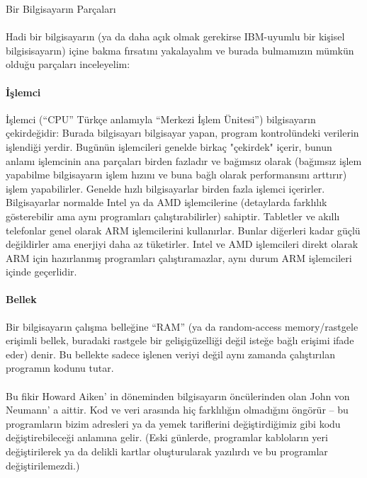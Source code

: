 \documentclass[10pt,a5paper]{book}
\begin{document}
\begin{section}{Bir Bilgisayarın Parçaları}

\paragraph{}{Hadi bir bilgisayarın (ya da daha açık olmak gerekirse IBM-uyumlu bir kişisel bilgisisayarın) içine bakma fırsatını yakalayalım ve burada bulmamızın mümkün olduğu parçaları inceleyelim:}
\paragraph{İşlemci}{İşlemci (“CPU” Türkçe anlamıyla “Merkezi İşlem Ünitesi”) bilgisayarın çekirdeğidir: Burada bilgisayarı bilgisayar yapan, program kontrolündeki verilerin işlendiği yerdir. Bugünün işlemcileri genelde birkaç "çekirdek" içerir, bunun anlamı işlemcinin ana parçaları birden fazladır ve bağımsız olarak (bağımsız işlem yapabilme bilgisayarın işlem hızını ve buna bağlı olarak performansını arttırır) işlem yapabilirler.  Genelde hızlı bilgisayarlar birden fazla işlemci içerirler. Bilgisayarlar normalde Intel ya da AMD işlemcilerine (detaylarda farklılık gösterebilir ama aynı programları çalıştırabilirler) sahiptir. Tabletler ve akıllı telefonlar genel olarak ARM işlemcilerini kullanırlar. Bunlar diğerleri kadar güçlü değildirler ama enerjiyi daha az tüketirler. Intel ve AMD işlemcileri direkt olarak ARM için hazırlanmış programları çalıştıramazlar, aynı durum ARM işlemcileri içinde geçerlidir.}
\paragraph{Bellek}{Bir bilgisayarın çalışma belleğine “RAM” (ya da random-access memory/rastgele erişimli bellek, buradaki rastgele bir gelişigüzelliği değil isteğe bağlı erişimi ifade eder) denir. Bu bellekte sadece işlenen veriyi değil aynı zamanda çalıştırılan programın kodunu tutar.}
\paragraph{}{Bu fikir Howard Aiken' in döneminden bilgisayarın öncülerinden olan John von Neumann' a aittir. Kod ve veri arasında hiç farklılığın olmadığını öngörür – bu programların bizim adresleri ya da yemek tariflerini değiştirdiğimiz gibi kodu değiştirebileceği anlamına gelir. (Eski günlerde, programlar kabloların yeri değiştirilerek ya da delikli kartlar oluşturularak yazılırdı ve bu programlar değiştirilemezdi.)}

\end{section}
\end{document}
